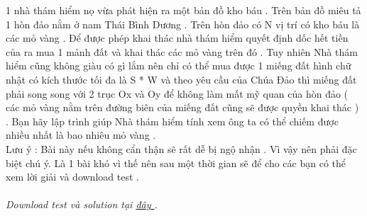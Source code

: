 1 nhà thám hiểm nọ vừa phát hiện ra một bản đồ kho báu . Trên bản đồ miêu tả 1 hòn đảo  nằm ở nam Thái Bình Dương . Trên hòn đảo có N vị trí có kho báu là các mỏ vàng . Để được phép khai thác nhà thám hiểm quyết định dốc hết tiền của ra mua 1 mảnh đất và khai thác các mỏ vàng trên đó . Tuy nhiên Nhà thám hiểm cũng không giàu có gì lắm nên chỉ có thể mua được 1 miếng đất hình chữ nhật có kích thước tối đa là S * W và theo yêu cầu của Chúa Đảo thì miếng đất phải song song với 2 trục Ox và Oy để không làm mất mỹ quan của hòn đảo ( các mỏ vàng nằm trên đường biên của miếng đất cũng sẽ được quyền khai thác ) . Bạn hãy lập trình giúp Nhà thám hiểm tính xem ông ta có thể chiếm được nhiều nhất là bao nhiêu mỏ vàng .   
\\       Lưu ý : Bài này nếu không cẩn thận sẽ rất dễ bị ngộ nhận . Vì vậy nên phải đặc biệt chú ý. Là 1 bài khó vì thế nên sau một thời gian sẽ để cho các bạn có thể xem lời giải và download test .      
\\
\\\textit{    Download test và solution tại    \href{http://vn.spoj.pl/content/GOLD.rar}{     đây    }    .   }

\